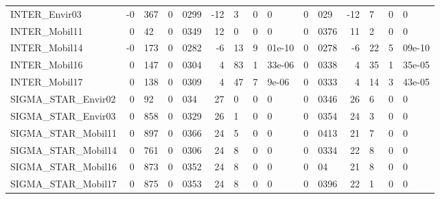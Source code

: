\documentclass[12pt,a4paper]{article}
\begin{document}
\begin{sidewaystable}[htb]
\begin{tabular}{lr@{.}lr@{.}lr@{.}lr@{.}lr@{.}lr@{.}lr@{.}l}
INTER\_Envir03              &  -0&367 &   0&0299 &   -12&3 &      0&0 &         0&029 &        -12&7 &           0&0 \\
INTER\_Mobil11              &    0&42 &   0&0349 &    12&0 &      0&0 &        0&0376 &         11&2 &           0&0 \\
INTER\_Mobil14              &  -0&173 &   0&0282 &   -6&13 & 9&01e-10 &        0&0278 &        -6&22 &      5&09e-10 \\
INTER\_Mobil16              &   0&147 &   0&0304 &    4&83 & 1&33e-06 &        0&0338 &         4&35 &      1&35e-05 \\
INTER\_Mobil17              &   0&138 &   0&0309 &    4&47 &  7&9e-06 &        0&0333 &         4&14 &      3&43e-05 \\
SIGMA\_STAR\_Envir02         &    0&92 &    0&034 &    27&0 &      0&0 &        0&0346 &         26&6 &           0&0 \\
SIGMA\_STAR\_Envir03         &   0&858 &   0&0329 &    26&1 &      0&0 &        0&0354 &         24&3 &           0&0 \\
SIGMA\_STAR\_Mobil11         &   0&897 &   0&0366 &    24&5 &      0&0 &        0&0413 &         21&7 &           0&0 \\
SIGMA\_STAR\_Mobil14         &   0&761 &   0&0306 &    24&8 &      0&0 &        0&0334 &         22&8 &           0&0 \\
SIGMA\_STAR\_Mobil16         &   0&873 &   0&0352 &    24&8 &      0&0 &          0&04 &         21&8 &           0&0 \\
SIGMA\_STAR\_Mobil17         &   0&875 &   0&0353 &    24&8 &      0&0 &        0&0396 &         22&1 &           0&0 \\
\hline
\end{tabular}
 \end{sidewaystable}
\end{document}
